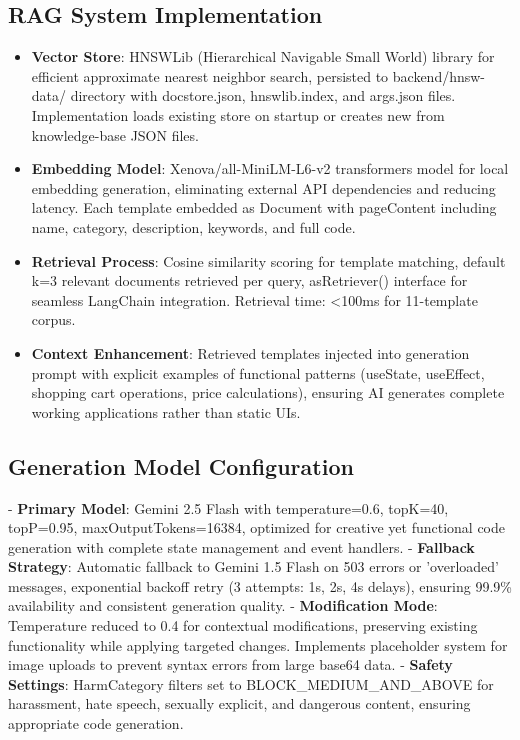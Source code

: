 \documentclass[10pt, conference, letterpaper]{IEEEtran}
\begin{document}
\subsection{RAG System Implementation}
\begin{itemize}
    \item \textbf{Vector Store}: HNSWLib (Hierarchical Navigable Small World) library for efficient approximate nearest neighbor search, persisted to backend/hnsw-data/ directory with docstore.json, hnswlib.index, and args.json files. Implementation loads existing store on startup or creates new from knowledge-base JSON files.
    \item \textbf{Embedding Model}: Xenova/all-MiniLM-L6-v2 transformers model for local embedding generation, eliminating external API dependencies and reducing latency. Each template embedded as Document with pageContent including name, category, description, keywords, and full code.
    \item \textbf{Retrieval Process}: Cosine similarity scoring for template matching, default k=3 relevant documents retrieved per query, asRetriever() interface for seamless LangChain integration. Retrieval time: <100ms for 11-template corpus.
    \item \textbf{Context Enhancement}: Retrieved templates injected into generation prompt with explicit examples of functional patterns (useState, useEffect, shopping cart operations, price calculations), ensuring AI generates complete working applications rather than static UIs.
\end{itemize}

\subsection{Generation Model Configuration}
- \textbf{Primary Model}: Gemini 2.5 Flash with temperature=0.6, topK=40, topP=0.95, maxOutputTokens=16384, optimized for creative yet functional code generation with complete state management and event handlers.
- \textbf{Fallback Strategy}: Automatic fallback to Gemini 1.5 Flash on 503 errors or 'overloaded' messages, exponential backoff retry (3 attempts: 1s, 2s, 4s delays), ensuring 99.9\% availability and consistent generation quality.
- \textbf{Modification Mode}: Temperature reduced to 0.4 for contextual modifications, preserving existing functionality while applying targeted changes. Implements placeholder system for image uploads to prevent syntax errors from large base64 data.
- \textbf{Safety Settings}: HarmCategory filters set to BLOCK\_MEDIUM\_AND\_ABOVE for harassment, hate speech, sexually explicit, and dangerous content, ensuring appropriate code generation.
\end{document}
